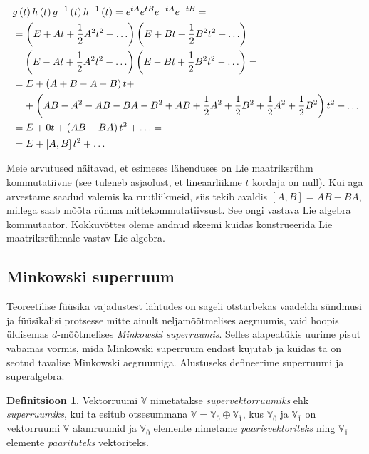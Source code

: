 \documentclass[12pt,a4paper,oneside]{article}
\theoremstyle{plain}
\theoremstyle{definition}
\newtheorem{definitsioon}{Definitsioon}[section]
\numberwithin{equation}{section}
\def\V{{\mathbb V}}
\begin{document}
\begin{align*}
&g\left(t\right) h\left(t\right) g^{-1}\left(t\right) 
	h^{-1}\left(t\right) = e^{tA} e^{tB} e^{-tA} e^{-tB} = \\
&= \left(E + At + \frac{1}{2}A^2 t^2 + \ldots \right) 
  \left(E + Bt + \frac{1}{2}B^2 t^2 + \ldots \right) \\
&\hphantom{=}\ \left(E - At + \frac{1}{2}A^2 t^2 - \ldots \right) 
	\left(E - Bt + \frac{1}{2}B^2 t^2 - \ldots \right) = \\
&= E + \left(A + B - A - B\right)t + \\
	&\hphantom{=\ }+ \left(AB - A^2 - AB - BA - B^2 + AB + \frac{1}{2} A^2 + 
	\frac{1}{2} B^2 + \frac{1}{2} A^2 + \frac{1}{2} B^2\right)t^2 + \ldots \\
&= E + 0t + \left(AB - BA\right)t^2 + \ldots = \\
&= E + \left[A, B\right]t^2 + \ldots
\end{align*}

Meie arvutused näitavad, et esimeses lähenduses on Lie maatriksrühm 
kommutatiivne (see tuleneb asjaolust, et lineaarliikme $t$ kordaja 
on null). Kui aga arvestame saadud valemis ka ruutliikmeid, siis 
tekib avaldis $\left[A,B\right] = AB - BA$, millega saab mõõta rühma 
mittekommutatiivsust. See ongi vastava Lie algebra kommutaator. 
Kokkuvõttes oleme andnud skeemi kuidas konstrueerida Lie 
maatriksrühmale vastav Lie algebra.

\subsection{Minkowski superruum}

Teoreetilise füüsika vajadustest lähtudes on sageli otstarbekas 
vaadelda sünd\-musi ja füüsikalisi protsesse mitte ainult 
neljamõõtmelises aegruumis, vaid hoopis üldisemas $d$-mõõtmelises
\emph{Minkowski superruumis}. Selles alapeatükis uurime pisut 
vabamas vormis, mida Minkowski superruum endast kujutab ja kuidas 
ta on seotud tavalise Minkowski aegruumiga. Alustuseks defineerime 
superruumi ja super\-algebra.

\begin{definitsioon}
Vektorruumi $\V$ nimetatakse \emph{supervektorruumiks} ehk 
\emph{superruumiks}, kui ta esitub otsesummana 
$\V = \V_{\overline{0}} \oplus \V_{\overline{1}}$, kus 
$\V_{\overline{0}}$ ja $\V_{\overline{1}}$ on vektorruumi $\V$ 
alamruumid ja $\V_{\overline{0}}$ elemente nimetame 
\emph{paarisvektoriteks} ning $\V_{\overline{1}}$ elemente 
\emph{paarituteks} vektoriteks.
\end{definitsioon}
\end{document}
